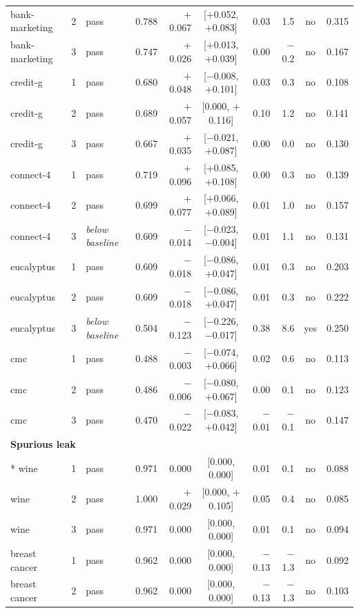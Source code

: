 {\begin{longtable}{lcl rrc rrcr}
bank-marketing & 2 & pass & 0.788 & $+$0.067 & [$+$0.052, $+$0.083] & 0.03 & 1.5 & no & 0.315 \\
bank-marketing & 3 & pass & 0.747 & $+$0.026 & [$+$0.013, $+$0.039] & 0.00 & $-$0.2 & no & 0.167 \\
\midrule
credit-g & 1 & pass & 0.680 & $+$0.048 & [$-$0.008, $+$0.101] & 0.03 & 0.3 & no & 0.108 \\
credit-g & 2 & pass & 0.689 & $+$0.057 & [0.000, $+$0.116] & 0.10 & 1.2 & no & 0.141 \\
credit-g & 3 & pass & 0.667 & $+$0.035 & [$-$0.021, $+$0.087] & 0.00 & 0.0 & no & 0.130 \\
\midrule
connect-4 & 1 & pass & 0.719 & $+$0.096 & [$+$0.085, $+$0.108] & 0.00 & 0.3 & no & 0.139 \\
connect-4 & 2 & pass & 0.699 & $+$0.077 & [$+$0.066, $+$0.089] & 0.01 & 1.0 & no & 0.157 \\
connect-4 & 3 & \emph{below baseline} & 0.609 & $-$0.014 & [$-$0.023, $-$0.004] & 0.01 & 1.1 & no & 0.131 \\
\midrule
eucalyptus & 1 & pass & 0.609 & $-$0.018 & [$-$0.086, $+$0.047] & 0.01 & 0.3 & no & 0.203 \\
eucalyptus & 2 & pass & 0.609 & $-$0.018 & [$-$0.086, $+$0.047] & 0.01 & 0.3 & no & 0.222 \\
eucalyptus & 3 & \emph{below baseline} & 0.504 & $-$0.123 & [$-$0.226, $-$0.017] & 0.38 & 8.6 & yes & 0.250 \\
\midrule
cmc & 1 & pass & 0.488 & $-$0.003 & [$-$0.074, $+$0.066] & 0.02 & 0.6 & no & 0.113 \\
cmc & 2 & pass & 0.486 & $-$0.006 & [$-$0.080, $+$0.067] & 0.00 & 0.1 & no & 0.123 \\
cmc & 3 & pass & 0.470 & $-$0.022 & [$-$0.083, $+$0.042] & $-$0.01 & $-$0.1 & no & 0.147 \\
\midrule
\multicolumn{10}{l}{\textbf{Spurious leak}}\\*
\addlinespace[2pt]
wine & 1 & pass & 0.971 & 0.000 & [0.000, 0.000] & 0.01 & 0.1 & no & 0.088 \\
wine & 2 & pass & 1.000 & $+$0.029 & [0.000, $+$0.105] & 0.05 & 0.4 & no & 0.085 \\
wine & 3 & pass & 0.971 & 0.000 & [0.000, 0.000] & 0.01 & 0.1 & no & 0.094 \\
\midrule
breast cancer & 1 & pass & 0.962 & 0.000 & [0.000, 0.000] & $-$0.13 & $-$1.3 & no & 0.092 \\
breast cancer & 2 & pass & 0.962 & 0.000 & [0.000, 0.000] & $-$0.13 & $-$1.3 & no & 0.103 \\

\end{longtable}}
